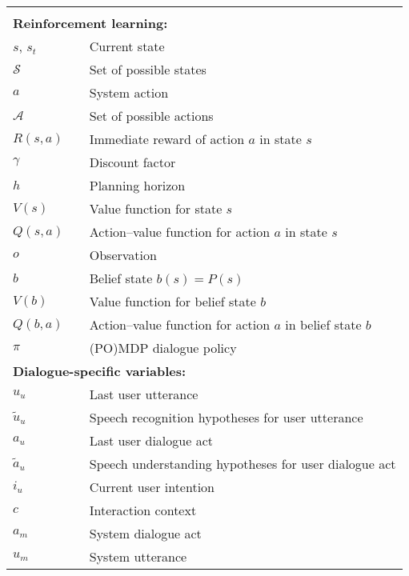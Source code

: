 \begin{longtable}{lp{5mm}p{95mm}}
&&  \vspace{0mm} \\
\multicolumn{3}{l}{\textbf{Reinforcement learning:}} \vspace{2mm} \\
$s$, $s_t$ && Current state \\
$\mathcal{S}$ && Set of possible states \\
$a$ && System action \\ 
$\mathcal{A}$ && Set of possible actions \\
$R(s,a)$ && Immediate reward of action $a$ in state $s$ \\
$\gamma$ && Discount factor \\
$h$ && Planning horizon \\
$V(s)$ && Value function for state $s$ \\
$Q(s,a)$ && Action--value function for action $a$ in state $s$  \\
$o$ && Observation \\
$b$ && Belief state $b(s) = P(s)$ \\
$V(b)$ && Value function for belief state $b$  \\
$Q(b,a)$ && Action--value function for action $a$ in belief state $b$ \\
$\pi$ && (PO)MDP dialogue policy \\

\multicolumn{3}{l}{\textbf{Dialogue-specific variables:}} \vspace{2mm} \\

$u_u$ && Last user utterance \\
$\tilde{u}_u$ && Speech recognition hypotheses for user utterance \\
$a_u$ && Last user dialogue act \\
$\tilde{a}_u$ && Speech understanding hypotheses for user dialogue act \\
$i_u$ && Current user intention \\
$c$ && Interaction context \\
$a_m$ && System dialogue act \\
$u_m$ && System utterance \\


\end{longtable}
